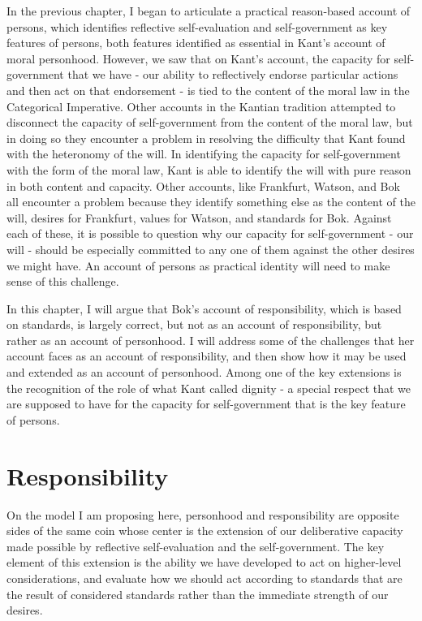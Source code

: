 \documentclass[phd,12pt,oneside,paper=letterpaper]{ubcthesis}
\begin{document}
In the previous chapter, I began to articulate a practical reason-based account of persons, which identifies reflective self-evaluation and self-government as key features of persons, both features identified as essential in Kant's account of moral personhood. However, we saw that on Kant's account, the capacity for self-government that we have - our ability to reflectively endorse particular actions and then act on that endorsement - is tied to the content of the moral law in the Categorical Imperative. Other accounts in the Kantian tradition attempted to disconnect the capacity of self-government from the content of the moral law, but in doing so they encounter a problem in resolving the difficulty that Kant found with the heteronomy of the will. In identifying the capacity for self-government with the form of the moral law, Kant is able to identify the will with pure reason in both content and capacity. Other accounts, like Frankfurt, Watson, and Bok all encounter a problem because they identify something else as the content of the will, desires for Frankfurt, values for Watson, and standards for Bok. Against each of these, it is possible to question why our capacity for self-government - our will - should be especially committed to any one of them against the other desires we might have. An account of persons as practical identity will need to make sense of this challenge.

In this chapter, I will argue that Bok's account of responsibility, which is based on standards, is largely correct, but not as an account of responsibility, but rather as an account of personhood. I will address some of the challenges that her account faces as an account of responsibility, and then show how it may be used and extended as an account of personhood. Among one of the key extensions is the recognition of the role of what Kant called dignity - a special respect that we are supposed to have for the capacity for self-government that is the key feature of persons. 

\section{Responsibility}
On the model I am proposing here, personhood and responsibility are opposite sides of the same coin whose center is the extension of our deliberative capacity made possible by reflective self-evaluation and the self-government. The key element of this extension is the ability we have developed to act on higher-level considerations, and evaluate how we should act according to standards that are the result of considered standards rather than the immediate strength of our desires. 
\end{document}
